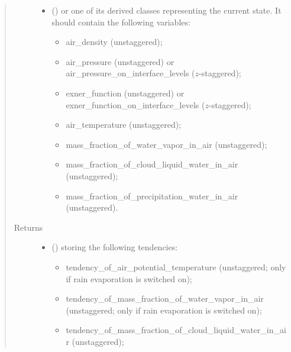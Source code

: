 \documentclass[letterpaper,10pt,english]{sphinxmanual}
\begin{document}
\begin{fulllineitems}
\begin{fulllineitems}
\begin{quote}
\begin{description}
\begin{itemize}
\item {} 
 () \textendash{} 
{\hyperref[\detokenize{api:tasmania.storages.grid_data.GridData}]{}} or one of its derived classes representing the current state.
It should contain the following variables:
\begin{itemize}
\item {} 
air\_density (unstaggered);

\item {} 
air\_pressure (unstaggered) or air\_pressure\_on\_interface\_levels (\(z\)-staggered);

\item {} 
exner\_function (unstaggered) or exner\_function\_on\_interface\_levels (\(z\)-staggered);

\item {} 
air\_temperature (unstaggered);

\item {} 
mass\_fraction\_of\_water\_vapor\_in\_air (unstaggered);

\item {} 
mass\_fraction\_of\_cloud\_liquid\_water\_in\_air (unstaggered);

\item {} 
mass\_fraction\_of\_precipitation\_water\_in\_air (unstaggered).

\end{itemize}


\end{itemize}

\item[{Returns}] \leavevmode
\begin{itemize}
\item {} 
 () \textendash{} {\hyperref[\detokenize{api:tasmania.storages.grid_data.GridData}]{}} storing the following tendencies:
\begin{itemize}
\item {} 
tendency\_of\_air\_potential\_temperature (unstaggered; only if rain evaporation is switched on);

\item {} 
tendency\_of\_mass\_fraction\_of\_water\_vapor\_in\_air (unstaggered; only if rain evaporation is switched on);

\item {} 
tendency\_of\_mass\_fraction\_of\_cloud\_liquid\_water\_in\_air (unstaggered);


\end{itemize}
\end{itemize}
\end{description}
\end{quote}
\end{fulllineitems}
\end{fulllineitems}
\end{document}
